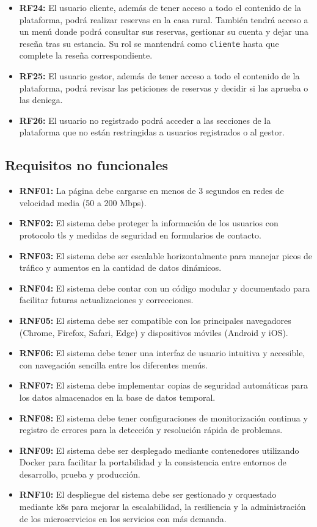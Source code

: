 \begin{itemize}
    \item \textbf{RF24:} El usuario cliente, además de tener acceso a todo el contenido de la plataforma, podrá realizar reservas en la casa rural. También tendrá acceso a un menú donde podrá consultar sus reservas, gestionar su cuenta y dejar una reseña tras su estancia. Su rol se mantendrá como \texttt{cliente} hasta que complete la reseña correspondiente.
    \item \textbf{RF25:} El usuario gestor, además de tener acceso a todo el contenido de la plataforma, podrá revisar las peticiones de reservas y decidir si las aprueba o las deniega.
    \item \textbf{RF26:} El usuario no registrado podrá acceder a las secciones de la plataforma que no están restringidas a usuarios registrados o al gestor.

    
\end{itemize}

\subsection{Requisitos no funcionales}
\begin{itemize}
    \item \textbf{RNF01:} La página debe cargarse en menos de 3 segundos en redes de velocidad media (50 a 200 Mbps).
    \item \textbf{RNF02:} El sistema debe proteger la información de los usuarios con protocolo \gls{tls} y medidas de seguridad en formularios de contacto.
    \item \textbf{RNF03:} El sistema debe ser escalable horizontalmente para manejar picos de tráfico y aumentos en la cantidad de datos dinámicos.
    \item \textbf{RNF04:} El sistema debe contar con un código modular y documentado para facilitar futuras actualizaciones y correcciones.
    \item \textbf{RNF05:} El sistema debe ser compatible con los principales navegadores (Chrome, Firefox, Safari, Edge) y dispositivos móviles (Android y iOS).
    \item \textbf{RNF06:} El sistema debe tener una interfaz de usuario intuitiva y accesible, con navegación sencilla entre los diferentes menús.
    \item \textbf{RNF07:} El sistema debe implementar copias de seguridad automáticas para los datos almacenados en la base de datos temporal.
    \item \textbf{RNF08:} El sistema debe tener configuraciones de monitorización continua y registro de errores para la detección y resolución rápida de problemas.
    \item \textbf{RNF09:} El sistema debe ser desplegado mediante contenedores utilizando Docker para facilitar la portabilidad y la consistencia entre entornos de desarrollo, prueba y producción.
    \item \textbf{RNF10:} El despliegue del sistema debe ser gestionado y orquestado mediante \gls{k8s} para mejorar la escalabilidad, la resiliencia y la administración de los microservicios en los servicios con más demanda.
\end{itemize}

